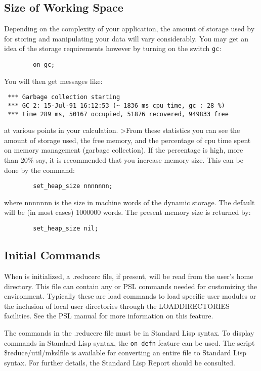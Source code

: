 \subsection{Size of Working Space} Depending on the complexity
of your application, the amount of storage
used by {\REDUCE} for storing and manipulating your data will vary
considerably. You may get an idea of the storage requirements however by
turning on the switch {\tt gc}:
\begin{verbatim}
        on gc;
\end{verbatim}
You will then get messages like:
\begin{verbatim}
 *** Garbage collection starting
 *** GC 2: 15-Jul-91 16:12:53 (~ 1836 ms cpu time, gc : 28 %)
 *** time 289 ms, 50167 occupied, 51876 recovered, 949833 free
\end{verbatim}
at various points in your calculation.
>From these statistics you can see the amount of storage used, the
free memory, and the percentage of cpu time spent on
memory management (garbage collection). If the percentage is high, more
than 20\% say, it is recommended that you increase memory size.
This can be done by the command:
\begin{verbatim}
        set_heap_size nnnnnnn;
\end{verbatim}
where nnnnnnn is the size in machine words of the dynamic storage.
The default will be (in most cases) 1000000 words. The present memory size
is returned by:
\begin{verbatim}
        set_heap_size nil;
\end{verbatim}

\subsection{Initial Commands} When {\REDUCE} is initialized,
a .reducerc file, if present, will be read
from the user's home directory.  This file can contain any {\REDUCE} or
PSL commands needed for customizing the {\REDUCE} environment.  Typically
these are load commands to load specific user modules or the inclusion
of local user directories through the LOADDIRECTORIES facilities.  See the
PSL manual for more information on this feature.

The commands in the .reducerc file must be in Standard Lisp syntax.  To
display {\REDUCE} commands in Standard Lisp syntax, the {\REDUCE} {\tt on
defn} feature can be used.  The script \$reduce/util/mkslfile is available
for converting an entire file to Standard Lisp syntax.  For further
details, the Standard Lisp Report should be consulted.

